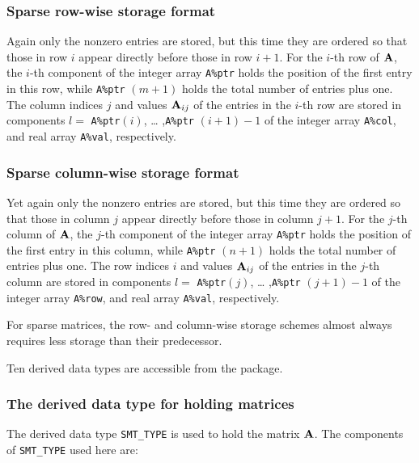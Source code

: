 \documentclass{galahad}
\begin{document}
\subsubsection{Sparse row-wise storage format}\label{rowwise}
Again only the nonzero entries are stored, but this time they are
ordered so that those in row $i$ appear directly before those in row
$i+1$. For the $i$-th row of ${\mathbf{A}}$, the $i$-th component of the integer
array {\tt A\%ptr} holds the position of the first entry in this row,
while {\tt A\%ptr} $(m+1)$ holds the total number of entries plus one.
The column indices $j$ and values ${\mathbf{A}}_{ij}$ of the entries in the
$i$-th row are stored in components $l =$ {\tt A\%ptr}$(i)$, \ldots
,{\tt A\%ptr} $(i+1)-1$ of the integer array {\tt A\%col}, and real
array {\tt A\%val}, respectively.

\subsubsection{Sparse column-wise storage format}\label{columnwise}
Yet again only the nonzero entries are stored, but this time they are
ordered so that those in column $j$ appear directly before those in column
$j+1$. For the $j$-th column of ${\mathbf{A}}$, the $j$-th component of the integer
array {\tt A\%ptr} holds the position of the first entry in this column,
while {\tt A\%ptr} $(n+1)$ holds the total number of entries plus one.
The row indices $i$ and values ${\mathbf{A}}_{ij}$ of the entries in the
$j$-th column are stored in components $l =$ {\tt A\%ptr}$(j)$, \ldots
,{\tt A\%ptr} $(j+1)-1$ of the integer array {\tt A\%row}, and real
array {\tt A\%val}, respectively.

For sparse matrices, the row- and column-wise storage schemes almost always
requires less storage than their predecessor.


\galtypes
Ten derived data types are accessible from the package.


\subsubsection{The derived data type for holding matrices}\label{typesmt}
The derived data type {\tt SMT\_TYPE} is used to hold the matrix ${\mathbf{A}}$.
The components of {\tt SMT\_TYPE} used here are:
\end{document}
